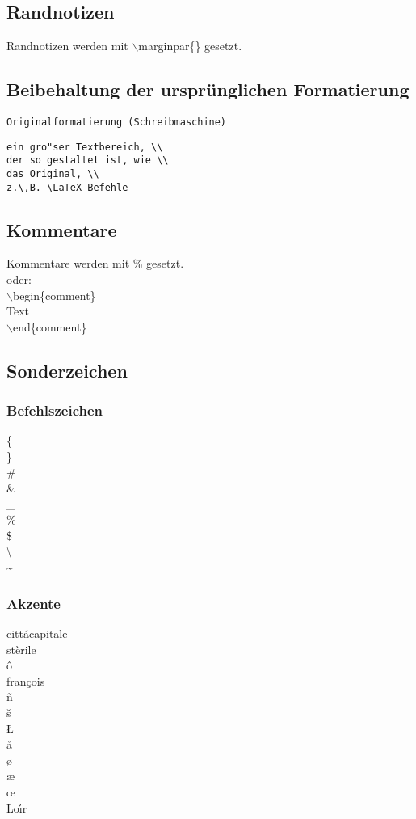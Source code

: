 \documentclass[a4paper,12pt,titlepage]{article} %
\begin{document}
\subsection{Randnotizen}
Randnotizen werden mit $\backslash$marginpar\{\} 
gesetzt.

\subsection{Beibehaltung der ursprünglichen Formatierung}
\verb:Originalformatierung (Schreibmaschine):
\begin{verbatim}
ein gro"ser Textbereich, \\
der so gestaltet ist, wie \\
das Original, \\
z.\,B. \LaTeX-Befehle
\end{verbatim}

\subsection{Kommentare}
Kommentare werden mit \% gesetzt. \\
oder: \\
$\backslash$begin\{comment\} \\
Text \\
$\backslash$end\{comment\} \\

\subsection{Sonderzeichen}
\subsubsection{Befehlszeichen}
\{ \\
\} \\
\# \\
\& \\
\_\\ %
\% \\
\$ \\
\textbackslash \\ %
\textasciitilde \\ %

\subsubsection{Akzente}
citt\'{a}capitale \\%
st\`{e}rile \\%
\^{o} \\%
fran\c{c}ois \\%
\~{n} \\
\v{s} \\
{\L} \\
{\aa} \\
{\o} \\
{\ae} \\
{\oe} \\
Lo\'{\i}r
\end{document}
